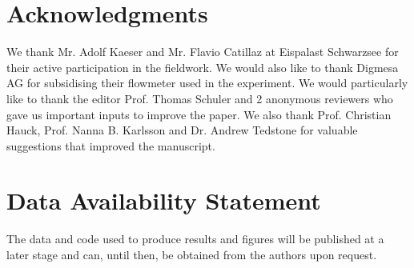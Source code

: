 \documentclass[utf8]{frontiersSCNS} %
\begin{document}
\section*{Acknowledgments} We thank Mr. Adolf Kaeser and Mr. Flavio Catillaz at Eispalast Schwarzsee for their active
participation in the fieldwork. We would also like to thank Digmesa AG for subsidising their flowmeter used in the
experiment. We would particularly like to thank the editor Prof. Thomas Schuler and 2 anonymous reviewers who gave us
important inputs to improve the paper. We also thank Prof. Christian Hauck, Prof. Nanna B. Karlsson and Dr. Andrew
Tedstone for valuable suggestions that improved the manuscript.


\section*{Data Availability Statement} The data and code used to produce results and figures will be published at a
later stage and can, until then, be obtained from the authors upon request.

 
\end{document}
